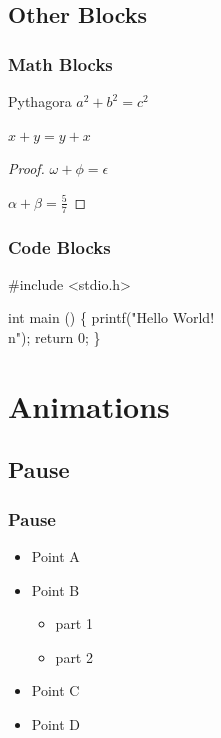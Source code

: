 \documentclass[aspectratio=169]{beamer}
\begin{document}
\subsection{Other Blocks}

\begin{frame}
	\frametitle{Math Blocks}
	\begin{theorem}{Pythagora}
		\( a^2 + b^2 = c^2 \)
	\end{theorem}
	\begin{corollary}
		\( x + y = y + x \)
	\end{corollary}
	\begin{proof}
		\( \omega + \phi = \epsilon \)

		\( \alpha + \beta = \frac{5}{7} \)
	\end{proof}
\end{frame}

\begin{frame}[fragile]
	\frametitle{Code Blocks}
	\begin{semiverbatim}
		#include <stdio.h>

		int main ()
		\{
			printf("Hello World!\\n");
			return 0;
		\}
	\end{semiverbatim}
\end{frame}

\section{Animations}

\subsection{Pause}

\begin{frame}
	\frametitle{Pause}
	\begin{itemize}
		\pause{}
		\item Point A
		\pause{}
		\item Point B
		\begin{itemize}
			\pause{}
			\item part 1
			\pause{}
			\item part 2
		\end{itemize}
		\pause{}
		\item Point C
			\pause{}
		\item Point D
	\end{itemize}
\end{frame}
\end{document}
